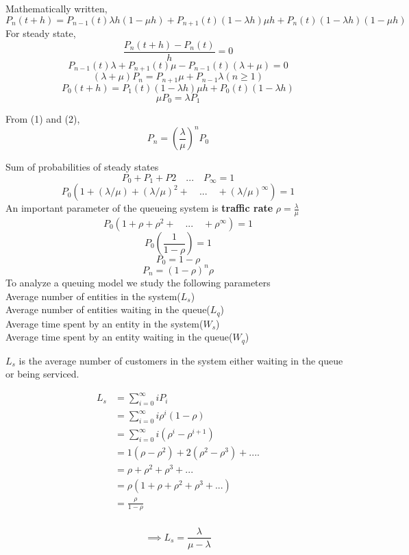 Mathematically written,
\[
P_n(t+h) = P_{n-1} (t)\lambda h(1-\mu h) + P_{n+1} (t)(1-\lambda h)\mu h + P_n(t)(1-\lambda h)(1-\mu h)
\]
For steady state,
\[
\frac{P_n(t+h)-P_n(t)}{h} = 0
\]
\[
 P_{n-1}(t)\lambda + P_{n+1}(t)\mu - P_{n-1}(t)(\lambda+\mu)=0
\]
\[
(\lambda + \mu)P_n = P_{n+1}\mu + P_{n-1}\lambda   (n \geq 1) \tag{1}
\]
\[
P_0(t+h) = P_1(t)(1-\lambda h)\mu h + P_0(t)(1-\lambda h)
\]
\[
\mu P_0=\lambda P_1 \tag{2}
\]

From (1) and (2),
\[
P_n=\left(\frac{\lambda}{\mu}\right)^{n}P_0
\]

Sum of probabilities of steady states
\[
P_0 + P_1 + P2\quad ... \quad P_\infty = 1
\]
\[
P_0(1+\left(\lambda/\mu\right)+\left(\lambda/\mu\right)^{2}+\quad...\quad+(\lambda/\mu)^{\infty})=1
\]
An important parameter of the queueing system is \textbf{traffic rate} $\rho =\frac{\lambda}{\mu}$
\[
P_0\left(1+ \rho + \rho^{2}+\quad ...\quad + \rho^{\infty}\right) = 1
\]
\[
P_0\left(\frac{1}{1-\rho}\right)=1
\]
\[
P_0=1-\rho
\]
\[
P_n=(1-\rho)^{n} \rho
\]
To analyze a queuing model we study the following parameters
\\Average number of entities in the system(\textbf{$L_s$})
\\Average number of entities waiting in the queue(\textbf{$L_q$})
\\Average time spent by an entity in the system(\textbf{$W_s$})
\\Average time spent by an entity waiting in the queue(\textbf{$W_q$})

$L_s$ is the average number of customers in the system either waiting in the queue or being serviced.

\begin{align*}
L_s & = \sum_{i=0}^{\infty} i P_i\\
& = \sum_{i=0}^{\infty} i \rho^{i}(1-\rho) \\
& = \sum_{i=0}^{\infty} i (\rho^{i}-\rho^{i+1}) \\
& = 1(\rho-\rho^{2}) + 2(\rho^{2}-\rho^{3}) + .... \\
& = \rho + \rho^{2} + \rho^{3} + ... \\
& = \rho(1+ \rho + \rho^{2} + \rho^{3} + ...)\\
& =\frac{\rho}{1-\rho}\\
\end{align*}

\begin{equation}
\implies L_s  = \frac{\lambda}{\mu-\lambda}
\end{equation}

